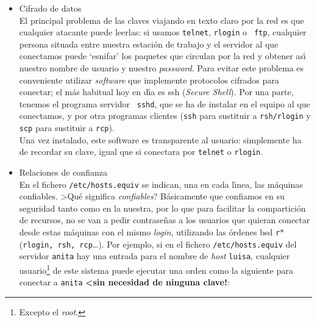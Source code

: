 \begin{itemize}
{s} en el campo de ejecuci\'on para grupo; podemos resetear los dos bits con
la orden vista anteriormente:
\tt
\begin{quote}
\begin{verbatim}
anita:/# ls -l /usr/lib/fs/ufs/ufsdump
-r-sr-sr-x  1 root  tty   144608 Oct 6 1998 /usr/lib/fs/ufs/ufsdump
anita:/# chmod -s /usr/lib/fs/ufs/ufsdump
anita:/# ls -l /usr/lib/fs/ufs/ufsdump
-r-xr-xr-x  1 root  tty   144608 Oct 6 1998 /usr/lib/fs/ufs/ufsdump
\end{verbatim}
\end{quote}
\rm
\item Cifrado de datos\\
El principal problema de las claves viajando en texto claro por la red es que
cualquier atacante puede leerlas: si usamos {\tt telnet}, {\tt rlogin} o {\tt
ftp}, cualquier persona situada entre nuestra estaci\'on de trabajo y el 
servidor al que conectamos puede `esnifar' los paquetes que circulan por la 
red y obtener as\'{\i} nuestro nombre de usuario y nuestro {\it password}.
Para evitar este problema es conveniente utilizar {\it software} que implemente
protocolos cifrados para conectar; el m\'as habitual hoy en d\'{\i}a es {\sc
ssh} ({\it Secure Shell}). Por una parte, tenemos el programa servidor {\tt 
sshd}, que se ha de instalar en el equipo al que conectamos, y por otra 
programas clientes ({\tt ssh} para sustituir a {\tt rsh/rlogin} y {\tt scp} 
para sustituir a {\tt rcp}).\\
Una vez instalado, este software es transparente al usuario: simplemente 
ha de recordar su clave, igual que si conectara por {\tt telnet} o {\tt rlogin}.
\item Relaciones de confianza\\
En el fichero {\tt /etc/hosts.equiv} se indican, una en cada l\'{\i}nea, las 
m\'aquinas confiables.
>Qu\'e significa {\it confiables}? B\'asicamente que confiamos en su seguridad
tanto como en la nuestra, por lo que para facilitar la compartici\'on de
recursos, no se van a pedir contrase\~nas a los usuarios que quieran conectar
desde estas m\'aquinas con el mismo {\it login}, utilizando las \'ordenes
{\sc bsd} {\tt r$\ast$} ({\tt rlogin, rsh, rcp}\ldots). Por ejemplo, si en el
fichero {\tt /etc/hosts.equiv} del servidor {\tt anita} hay una entrada
para el nombre
de {\it host} {\tt luisa}, cualquier usuario\footnote{Excepto el {\it
root}.} de este sistema puede ejecutar una orden como la siguiente para
conectar a {\tt anita} {\bf <sin necesidad de ninguna clave!}:
\tt
\begin{quote}

\end{quote}
\end{itemize}
